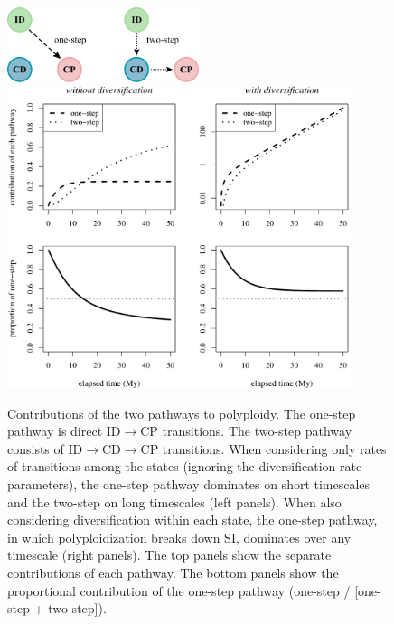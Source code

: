 \begin{figure}
    \centering 
    \includegraphics[width=0.5\textwidth]{pathstates2} \\ [40pt] 
        \includegraphics[width=0.9\textwidth]{pathways}
    \caption{
        Contributions of the two pathways to polyploidy.
        The one-step pathway is direct ID$\rightarrow$CP transitions.
        The two-step pathway consists of ID$\rightarrow$CD$\rightarrow$CP transitions.
        When considering only rates of transitions among the states (ignoring the diversification rate parameters), the one-step pathway dominates on short timescales and the two-step on long timescales (left panels).
        When also considering diversification within each state, the one-step pathway, in which polyploidization breaks down SI, dominates over any timescale (right panels).
        The top panels show the separate contributions of each pathway.
        The bottom panels show the proportional contribution of the one-step pathway (\ie one-step / [one-step + two-step]).
    }
    \label{figure:pathways}
\end{figure}

